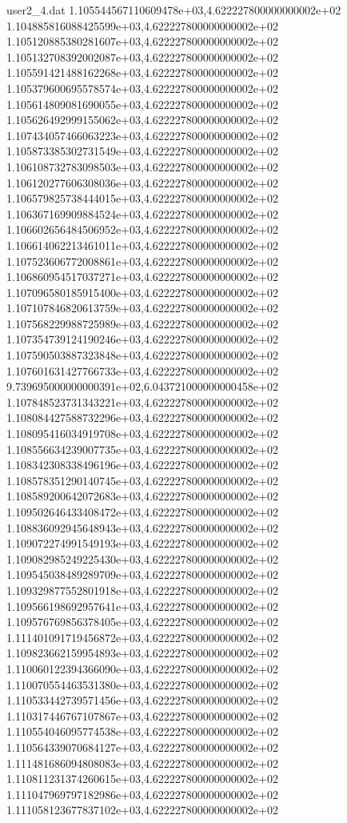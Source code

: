 \begin{filecontents}{user2_4.dat}
1.105544567110609478e+03,4.622227800000000002e+02
1.104885816088425599e+03,4.622227800000000002e+02
1.105120885380281607e+03,4.622227800000000002e+02
1.105132708392002087e+03,4.622227800000000002e+02
1.105591421488162268e+03,4.622227800000000002e+02
1.105379600695578574e+03,4.622227800000000002e+02
1.105614809081690055e+03,4.622227800000000002e+02
1.105626492999155062e+03,4.622227800000000002e+02
1.107434057466063223e+03,4.622227800000000002e+02
1.105873385302731549e+03,4.622227800000000002e+02
1.106108732783098503e+03,4.622227800000000002e+02
1.106120277606308036e+03,4.622227800000000002e+02
1.106579825738444015e+03,4.622227800000000002e+02
1.106367169909884524e+03,4.622227800000000002e+02
1.106602656484506952e+03,4.622227800000000002e+02
1.106614062213461011e+03,4.622227800000000002e+02
1.107523606772008861e+03,4.622227800000000002e+02
1.106860954517037271e+03,4.622227800000000002e+02
1.107096580185915400e+03,4.622227800000000002e+02
1.107107846820613759e+03,4.622227800000000002e+02
1.107568229988725989e+03,4.622227800000000002e+02
1.107354739124190246e+03,4.622227800000000002e+02
1.107590503887323848e+03,4.622227800000000002e+02
1.107601631427766733e+03,4.622227800000000002e+02
9.739695000000000391e+02,6.043721000000000458e+02
1.107848523731343221e+03,4.622227800000000002e+02
1.108084427588732296e+03,4.622227800000000002e+02
1.108095416034919708e+03,4.622227800000000002e+02
1.108556634239007735e+03,4.622227800000000002e+02
1.108342308338496196e+03,4.622227800000000002e+02
1.108578351290140745e+03,4.622227800000000002e+02
1.108589200642072683e+03,4.622227800000000002e+02
1.109502646433408472e+03,4.622227800000000002e+02
1.108836092945648943e+03,4.622227800000000002e+02
1.109072274991549193e+03,4.622227800000000002e+02
1.109082985249225430e+03,4.622227800000000002e+02
1.109545038489289709e+03,4.622227800000000002e+02
1.109329877552801918e+03,4.622227800000000002e+02
1.109566198692957641e+03,4.622227800000000002e+02
1.109576769856378405e+03,4.622227800000000002e+02
1.111401091719456872e+03,4.622227800000000002e+02
1.109823662159954893e+03,4.622227800000000002e+02
1.110060122394366090e+03,4.622227800000000002e+02
1.110070554463531380e+03,4.622227800000000002e+02
1.110533442739571456e+03,4.622227800000000002e+02
1.110317446767107867e+03,4.622227800000000002e+02
1.110554046095774538e+03,4.622227800000000002e+02
1.110564339070684127e+03,4.622227800000000002e+02
1.111481686094808083e+03,4.622227800000000002e+02
1.110811231374260615e+03,4.622227800000000002e+02
1.111047969797182986e+03,4.622227800000000002e+02
1.111058123677837102e+03,4.622227800000000002e+02

\end{filecontents}
